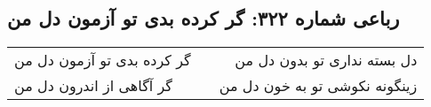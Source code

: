 \begin{center}
\section*{رباعی شماره ۳۲۲: گر کرده بدی تو آزمون دل من}
\label{sec:sh322}
\begin{longtable}{l p{0.5cm} r}
گر کرده بدی تو آزمون دل من
&&
دل بسته نداری تو بدون دل من
\\
گر آگاهی از اندرون دل من
&&
زینگونه نکوشی تو به خون دل من
\\
\end{longtable}
\end{center}
